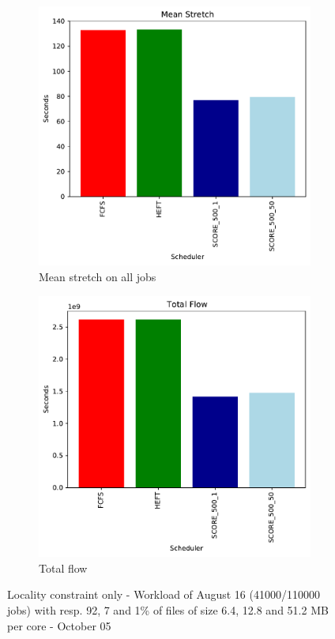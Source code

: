 \documentclass[a4paper]{article}
\begin{document}
\begin{figure}[H]
\begin{subfigure}[b]{0.4\linewidth}\centering\includegraphics[width=0.9\linewidth]{MBSS/plot/Results_FCFS_Score_Adaptative_Multiplier_2022-08-16->2022-08-16_V9271_Mean_Stretch_450_128_32_256_4_1024.pdf}\caption{Mean stretch on all jobs}\end{subfigure}
\begin{subfigure}[b]{0.4\linewidth}\centering\includegraphics[width=0.9\linewidth]{MBSS/plot/Results_FCFS_Score_Adaptative_Multiplier_2022-08-16->2022-08-16_V9271_Total_flow_450_128_32_256_4_1024.pdf}\caption{Total flow}\end{subfigure}
\caption{Locality constraint only - Workload of August 16 (41000/110000 jobs) with resp. 92, 7 and 1\% of files of size 6.4, 12.8 and 51.2 MB per core - October 05}\end{figure}
\end{document}
